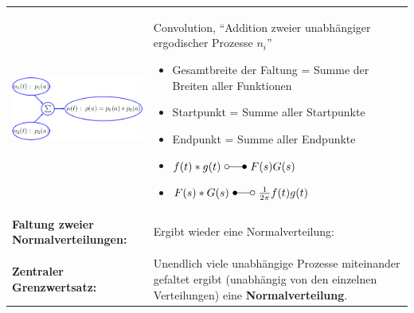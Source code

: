 		\begin{tabularx}{\textwidth}{lX}
			\parbox{5cm}{
				\includegraphics[width=5cm]{./bilder/faltung.png}
			}
			& 	\parbox{13cm}{
				Convolution, ``Addition zweier unabhängiger ergodischer Prozesse $n_i$'' \\
				 \\
				
				\begin{itemize}
					\item Gesamtbreite der Faltung = Summe der Breiten aller Funktionen
					\item Startpunkt = Summe aller Startpunkte
					\item Endpunkt = Summe aller Endpunkte
					\item $f(t) * g(t) \ \laplace \ F(s) G(s)$
					\item $F(s) * G(s) \ \Laplace \ \frac{1}{2 \pi} f(t) g(t)$
				\end{itemize}
			}
			\\
			\textbf{Faltung zweier Normalverteilungen:}
			&
			Ergibt wieder eine Normalverteilung: \newline
			\\ & \\
			\textbf{Zentraler Grenzwertsatz:}
			&	Unendlich viele unabhängige Prozesse miteinander gefaltet ergibt
			(unabhängig von den einzelnen Verteilungen) eine \textbf{Normalverteilung}.
		\end{tabularx}
	
